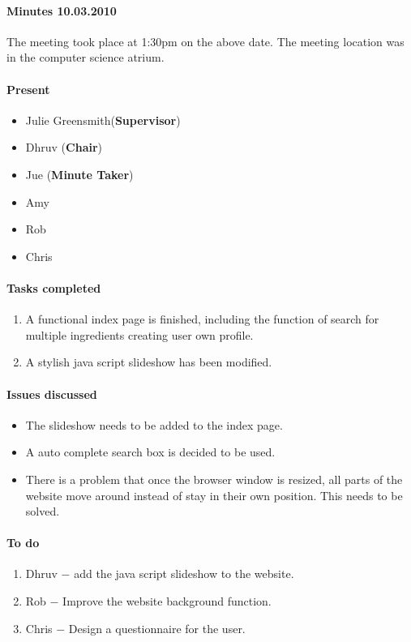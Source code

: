\paragraph{Minutes 10.03.2010}  
The meeting took place at 1:30pm on the above date. The meeting location was in the computer science atrium. 

\paragraph{Present}

\begin{itemize}
	\item Julie Greensmith(\textbf{Supervisor})
	\item Dhruv (\textbf{Chair})
	\item Jue (\textbf{Minute Taker})
	\item Amy
	\item Rob
	\item Chris
	
\end{itemize}

\paragraph{Tasks completed}

\begin{enumerate}
	\item A functional index page is finished, including the function of search for multiple ingredients creating user own profile.
	\item A stylish java script slideshow has been modified.
\end{enumerate}

\paragraph{Issues discussed}

\begin{itemize}
	\item The slideshow needs to be added to the index page.
	\item A auto complete search box is decided to be used.
	\item There is a problem that once the browser window is resized, all parts of the website move around instead of stay in their own position. This needs to be solved.
	
\end{itemize}

\paragraph{To do}

\begin{enumerate}
	\item Dhruv $-$ add the java script slideshow to the website.
	\item Rob $-$ Improve the website background function.
	\item Chris $-$ Design a questionnaire for the user.
\end{enumerate}